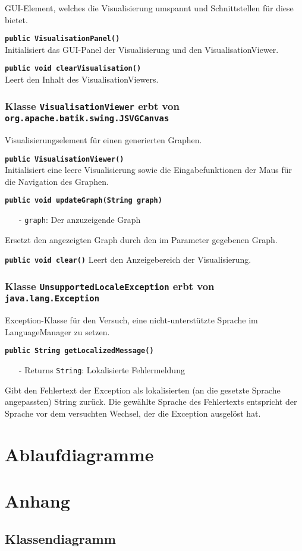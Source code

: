 \documentclass[parskip=full,11pt,twoside]{scrartcl}
\begin{document}
GUI-Element, welches die Visualisierung umspannt und Schnittstellen für diese bietet.

\textbf{\texttt{public VisualisationPanel()}}\\
Initialisiert das GUI-Panel der Visualisierung und den VisualisationViewer.

\textbf{\texttt{public void clearVisualisation()}}\\
Leert den Inhalt des VisualisationViewers.

\subsubsection{Klasse \texttt{VisualisationViewer} erbt von \texttt{org.apache.batik.swing.JSVGCanvas}}

Visualisierungselement für einen generierten Graphen.

\textbf{\texttt{public VisualisationViewer()}}\\
Initialisiert eine leere Visualisierung sowie die Eingabefunktionen der Maus für die Navigation des Graphen.

\textbf{\texttt{public void updateGraph(String graph)}}
\begin{itemize}[noitemsep]
	\item[-] \texttt{graph}: Der anzuzeigende Graph
\end{itemize}
Ersetzt den angezeigten Graph durch den im Parameter gegebenen Graph.

\textbf{\texttt{public void clear()}}
Leert den Anzeigebereich der Visualisierung.

\subsubsection{Klasse \texttt{UnsupportedLocaleException} erbt von \texttt{java.lang.Exception}}
Exception-Klasse für den Versuch, eine nicht-unterstützte Sprache im LanguageManager zu setzen.

\textbf{\texttt{public String getLocalizedMessage()}}
\begin{itemize}[noitemsep]
	\item[-] Returns \texttt{String}: Lokalisierte Fehlermeldung
\end{itemize}
Gibt den Fehlertext der Exception als lokalisierten (an die gesetzte Sprache angepassten) String zurück. Die gewählte Sprache des Fehlertexts entspricht der Sprache vor dem versuchten Wechsel, der die Exception ausgelöst hat.

\section{Ablaufdiagramme}

\appendix

\section{Anhang}

\subsection{Klassendiagramm}
\end{document}
